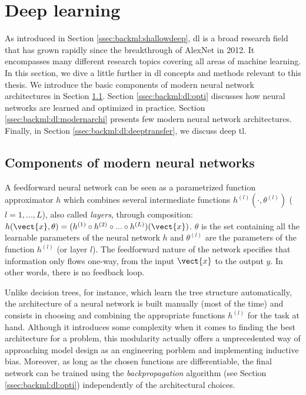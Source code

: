 \section{Deep learning}
\label{sec:backml:deeplearning}

As introduced in Section \ref{ssec:backml:shallowdeep}, \acrlong{dl} is a broad
research field that has grown rapidly since the breakthrough of AlexNet in 2012.
It encompasses many different research topics covering all areas of machine
learning. In this section, we dive a little further in \acrlong{dl} concepts and
methods relevant to this thesis. We introduce the basic components of modern neural
network architectures in Section \ref{ssec:backml:dp:components}. Section
\ref{ssec:backml:dl:opti} discusses how neural networks are learned and optimized
in practice. Section \ref{ssec:backml:dl:modernarchi} presents few modern neural
network architectures. Finally, in Section \ref{ssec:backml:dl:deeptransfer}, we
discuss deep \acrlong{tl}.

\subsection{Components of modern neural networks}
\label{ssec:backml:dp:components}

A feedforward neural network can be seen as a parametrized function approximator
$h$ which combines several intermediate functions $h^{(l)}(\cdot, \theta^{(l)})$
($l=1, ..., L$), also called \textit{layers}, through composition:
$h(\vect{x}, \theta) = (h^{(1)} \circ h^{(2)} \circ ... \circ h^{(L)})(\vect{x})$.
$\theta$ is the set containing all the learnable parameters of the neural network
$h$ and $\theta^{(l)}$ are the parameters of the function $h^{(l)}$ (or layer $l$).
The feedforward nature of the network specifies that information only flows one-way,
from the input $\vect{x}$ to the output $y$. In other words, there is no feedback
loop.

Unlike decision trees, for instance, which learn the tree structure automatically,
the architecture of a neural network is built manually (most of the time) and
consists in choosing and combining the appropriate functions $h^{(l)}$ for the
task at hand. Although it introduces some complexity when it comes to finding
the best architecture for a problem, this modularity actually offers a unprecedented
way of approaching model design as an engineering porblem and implementing inductive bias. Moreover, as long as the chosen functions are
differentiable, the final network can be trained using the \textit{backpropagation}
algorithm (see Section \ref{ssec:backml:dl:opti}) independently of the architectural
choices.

